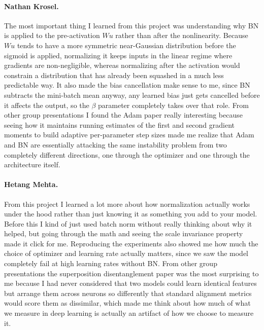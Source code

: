 \documentclass{article}
\begin{document}
\paragraph{Nathan Krosel.}
The most important thing I learned from this project was understanding why BN is 
applied to the pre-activation $Wu$ rather than after the nonlinearity. Because $Wu$ 
tends to have a more symmetric near-Gaussian distribution before the sigmoid is 
applied, normalizing it keeps inputs in the linear regime where gradients are 
non-negligible, whereas normalizing after the activation would constrain a 
distribution that has already been squashed in a much less predictable way. It also 
made the bias cancellation make sense to me, since BN subtracts the mini-batch mean 
anyway, any learned bias just gets cancelled before it affects the output, so the 
$\beta$ parameter completely takes over that role. From other group presentations I 
found the Adam paper really interesting because seeing how it maintains running 
estimates of the first and second gradient moments to build adaptive per-parameter 
step sizes made me realize that Adam and BN are essentially attacking the same 
instability problem from two completely different directions, one through the 
optimizer and one through the architecture itself.

\paragraph{Hetang Mehta.}
From this project I learned a lot more about how normalization actually works under 
the hood rather than just knowing it as something you add to your model. Before this 
I kind of just used batch norm without really thinking about why it helped, but going 
through the math and seeing the scale invariance property made it click for me. 
Reproducing the experiments also showed me how much the choice of optimizer and 
learning rate actually matters, since we saw the model completely fail at high learning 
rates without BN. From other group presentations the superposition disentanglement 
paper was the most surprising to me because I had never considered that two models 
could learn identical features but arrange them across neurons so differently that 
standard alignment metrics would score them as dissimilar, which made me think about 
how much of what we measure in deep learning is actually an artifact of how we choose 
to measure it.
\end{document}
